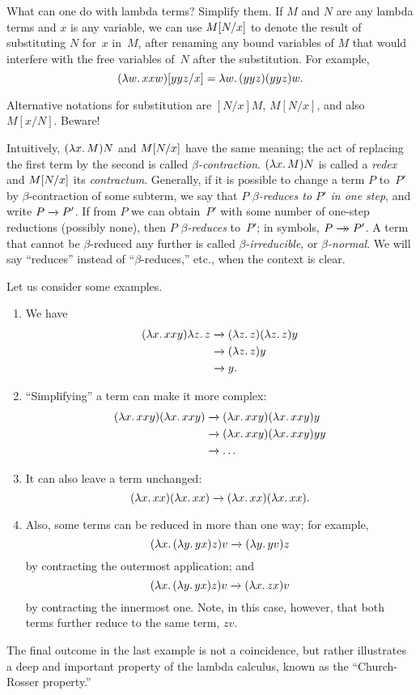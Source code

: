 \documentclass[../../../include/open-logic-section]{subfiles}
\begin{document}

What can one do with lambda terms? Simplify them. If $M$ and $N$ are
any lambda terms and $x$ is any variable, we can use $M[N/x]$ to
denote the result of substituting $N$ for~$x$ in~$M$, after renaming
any bound variables of $M$ that would interfere with the free
variables of~$N$ after the substitution. For example,
\[
\Subst{(\lambd[w][xxw])}{yyz}{x} = \lambd[w][(yyz)(yyz)w].
\]

\begin{digress}
Alternative notations for substitution are $[N/x]M$, $M[N/x]$, and
also $M[x/N]$. Beware!
\end{digress}

Intuitively, $(\lambd[x][M])N$ and $M[N/x]$ have the same
meaning; the act of replacing the first term by the second is called
\emph{$\beta$-contraction}. $(\lambd[x][M])N$ is called a \emph{redex}
and $M[N/x]$ its \emph{contractum}. Generally, if it is
possible to change a term $P$ to~$P'$ by $\beta$-contraction of some
subterm, we say that $P$ \emph{$\beta$-reduces to $P'$ in one step},
and write $P \redone P'$. If from $P$ we can obtain~$P'$ with some
number of one-step reductions (possibly none), then $P$
\emph{$\beta$-reduces} to~$P'$; in symbols, $P \red P'$. A term that
cannot be $\beta$-reduced any further is called
\emph{$\beta$-irreducible}, or \emph{$\beta$-normal}. We will say
``reduces'' instead of ``$\beta$-reduces,'' etc., when the context is
clear.

Let us consider some examples.
\begin{enumerate}
\item We have
\begin{align*}
(\lambd[x][xxy]) \lambd[z][z] & \redone (\lambd[z][z])(\lambd[z][z]) y \\
& \redone (\lambd[z][z]) y \\
& \redone y.
\end{align*}
\item ``Simplifying'' a term can make it more complex:
\begin{align*}
(\lambd[x][xxy])(\lambd[x][xxy]) & \redone (\lambd[x][xxy])(\lambd[x][xxy])y \\
& \redone (\lambd[x][xxy])(\lambd[x][xxy])yy \\
& \redone \dots
\end{align*}
\item It can also leave a term unchanged:
\[
(\lambd[x][xx])(\lambd[x][xx]) \redone (\lambd[x][xx])(\lambd[x][xx]).
\]
\item Also, some terms can be reduced in more than one way; for
  example,
\[
(\lambd[x][(\lambd[y][yx]) z)] v \redone (\lambd[y][yv]) z
\]
by contracting the outermost application; and
\[
(\lambd[x][(\lambd[y][yx]) z)] v \redone (\lambd[x][zx]) v
\]
by contracting the innermost one. Note, in this case, however, that
both terms further reduce to the same term, $zv$.
\end{enumerate}

The final outcome in the last example is not a coincidence, but rather
illustrates a deep and important property of the lambda calculus, known as the
``Church-Rosser property.''
\end{document}
